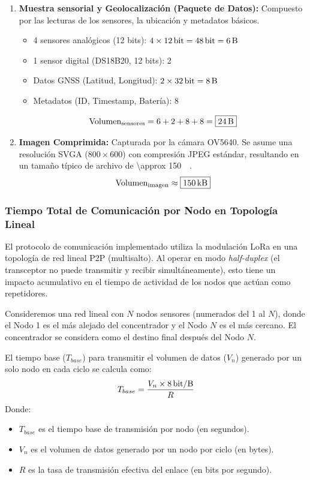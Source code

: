 \begin{enumerate}
    \item \textbf{Muestra sensorial y Geolocalización (Paquete de Datos):} Compuesto por las lecturas de los sensores, la ubicación y metadatos básicos.
    \begin{itemize}
        \item 4 sensores analógicos (12 bits): $4 \times \SI{12}{\bit} = \SI{48}{\bit} = \SI{6}{\byte}$
        \item 1 sensor digital (DS18B20, 12 bits): \SI{2}{\byte}
        \item Datos GNSS (Latitud, Longitud): $2 \times \SI{32}{\bit} = \SI{8}{\byte}$
        \item Metadatos (ID, Timestamp, Batería): \SI{8}{\byte}
    \end{itemize}
    \[
    \text{Volumen}_{\text{sensores}} = 6 + 2 + 8 + 8 = \boxed{\SI{24}{\byte}}
    \]

    \item \textbf{Imagen Comprimida:} Capturada por la cámara OV5640. Se asume una resolución SVGA ($800 \times 600$) con compresión JPEG estándar, resultando en un tamaño típico de archivo de \SI{\approx 150}{\kilo\byte}.
    \[
    \text{Volumen}_{\text{imagen}} \approx \boxed{\SI{150}{\kilo\byte}}
    \]
\end{enumerate}


\subsubsection*{Tiempo Total de Comunicación por Nodo en Topología Lineal}
\label{ssubsec:tiempo_general_comm}

El protocolo de comunicación implementado utiliza la modulación LoRa en una topología de red lineal P2P (multisalto). Al operar en modo \textit{half-duplex} (el transceptor no puede transmitir y recibir simultáneamente), esto tiene un impacto acumulativo en el tiempo de actividad de los nodos que actúan como repetidores.

Consideremos una red lineal con $N$ nodos sensores (numerados del 1 al $N$), donde el Nodo 1 es el más alejado del concentrador y el Nodo $N$ es el más cercano. El concentrador se considera como el destino final después del Nodo $N$.

El tiempo base ($T_{base}$) para transmitir el volumen de datos ($V_n$) generado por un solo nodo en cada ciclo se calcula como:
\begin{equation} \label{eq:tiempo_base}
T_{base} = \frac{V_n \times \SI[per-mode = symbol]{8}{\bit\per\byte}}{R}
\end{equation}
Donde:
\begin{itemize}
    \item $T_{base}$ es el tiempo base de transmisión por nodo (en segundos).
    \item $V_n$ es el volumen de datos generado por un nodo por ciclo (en bytes).
    \item $R$ es la tasa de transmisión efectiva del enlace (en bits por segundo).
\end{itemize}

